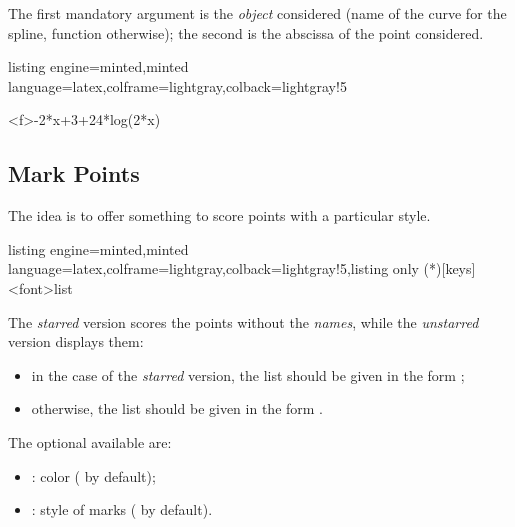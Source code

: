 \documentclass[11pt,a4paper]{ltxdoc}
\begin{document}
The first mandatory argument is the \textit{object} considered (name of the curve for the spline, function otherwise); the second is the abscissa of the point considered.

\begin{tcblisting}{listing engine=minted,minted language=latex,colframe=lightgray,colback=lightgray!5}
\begin{GraphTikz}%
	[x=0.9cm,y=0.425cm,Xmin=4,Xmax=20,Origx=4,
	Ymin=40,Ymax=56,Ygrid=2,Ygrids=1,Origy=40]
	{-2*x+3+24*log(2*x)}
\end{GraphTikz}
\end{tcblisting}

\pagebreak

\subsection{Mark Points}\label{markpts}

The idea is to offer something to score points with a particular style.

\begin{tcblisting}{listing engine=minted,minted language=latex,colframe=lightgray,colback=lightgray!5,listing only}
\MarkPts(*)[keys]<font>{list}
\end{tcblisting}

The \textit{starred} version scores the points without the \textit{names}, while the \textit{unstarred} version displays them:

\begin{itemize}
	\item in the case of the \textit{starred} version, the list should be given in the form ;
	\item otherwise, the list should be given in the form .
\end{itemize}

\smallskip

The optional \MontreCode{[keys]} available are:

\smallskip

\begin{itemize}
	\item {}: color ( by default);
	\item {}: style of marks ( by default).
\end{itemize}
\end{document}
